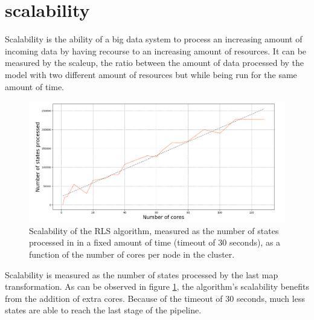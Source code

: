 \section{scalability}

Scalability is the ability of a big data system to process
an increasing amount of incoming data by having recourse
to an increasing amount of resources. It can be measured
by the scaleup, the ratio between the amount of data processed
by the model with two different amount of resources but
while being run for the same amount of time.

\begin{figure}[H]
    \begin{center}
        \includegraphics[width=\textwidth, keepaspectratio]{imgs/nmodels.png}
        \caption{Scalability of the RLS algorithm, measured as the number
            of states processed in in a fixed amount of time (timeout of 30 seconds),
            as a function of the number of cores per node in the cluster.}
        \label{nmodels}
    \end{center}
\end{figure}

Scalability is measured as the number of states processed by the last map transformation.
As can be observed in figure \ref{nmodels}, the algorithm's scalability benefits from the addition
of extra cores. Because of the timeout of 30 seconds, much less states are able to reach the last stage
of the pipeline.
